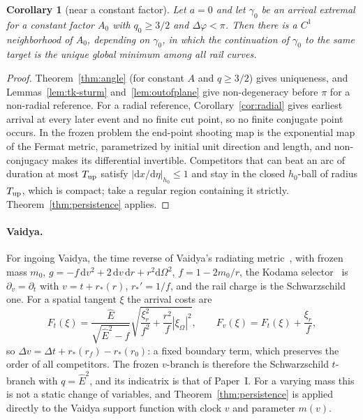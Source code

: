 \documentclass[aip,jmp,amsmath,amssymb,reprint]{revtex4-2}
\newcommand{\Ehat}{\hat E}
\newcommand{\dd}{\mathrm{d}}
\theoremstyle{plain}
\newtheorem{corollary}[proposition]{Corollary}
\theoremstyle{definition}
\begin{document}
\begin{corollary}[near a constant factor]\label{cor:band}
Let $a=0$ and let $\gamma_0$ be an arrival extremal for a constant factor $A_0$ with
$q_0\ge3/2$ and $\Delta\varphi<\pi$. Then there is a $C^1$ neighborhood of $A_0$, depending
on $\gamma_0$, in which the continuation of $\gamma_0$ to the same target is the unique global
minimum among all rail curves.
\end{corollary}

\begin{proof}
Theorem~\ref{thm:angle} (for constant $A$ and $q\ge3/2$) gives uniqueness, and Lemmas~\ref{lem:tk-sturm}
and~\ref{lem:outofplane} give non-degeneracy before $\pi$ for a non-radial reference. For a radial reference,
Corollary~\ref{cor:radial} gives earliest arrival at every later event and no finite cut point, so no
finite conjugate point occurs. In the frozen problem the end-point shooting map is the exponential
map of the Fermat metric, parametrized by initial unit direction and length, and non-conjugacy
makes its differential invertible. Competitors that can
beat an arc of duration at most $T_{\rm up}$ satisfy $|\dd x/\dd\eta|_{h_0}\le1$ and stay in
the closed $h_0$-ball of radius $T_{\rm up}$, which is compact; take a regular region
containing it strictly. Theorem~\ref{thm:persistence} applies.
\end{proof}

\paragraph{Vaidya.} For ingoing Vaidya, the time reverse of Vaidya's radiating metric~\cite{Vaidya1951}, with frozen mass $m_0$,
$g=-f\,\dd v^2+2\,\dd v\,\dd r+r^2\dd\Omega^2$, $f=1-2m_0/r$, the Kodama
selector~\cite{Kodama1980,AbreuVisser2010} is $\partial_v=\partial_t$ with $v=t+r_*(r)$, $r_*'=1/f$, and the
rail charge is the Schwarzschild one. For a spatial tangent $\xi$ the arrival costs are
\begin{equation}
  F_t(\xi)=\frac{\Ehat}{\sqrt{\Ehat^2-f}}\sqrt{\frac{\xi_r^2}{f^2}+\frac{r^2}{f}|\xi_\Omega|^2},
  \qquad F_v(\xi)=F_t(\xi)+\frac{\xi_r}{f},
  \label{eq:vaidya-costs}
\end{equation}
so $\Delta v=\Delta t+r_*(r_f)-r_*(r_0)$: a fixed boundary term, which preserves the order of
all competitors. The frozen $v$-branch is therefore the Schwarzschild $t$-branch with
$q=\Ehat^2$, and its indicatrix is that of Paper~I. For a varying mass this is not a static
change of variables, and Theorem~\ref{thm:persistence} is applied directly to the Vaidya
support function with clock $v$ and parameter $m(v)$.
\end{document}

